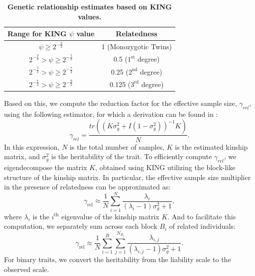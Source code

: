 \begin{table}[h!]
\centering
\begin{tabular}{|c|c|}
\hline
\textbf{Range for KING $\psi$ value} & \textbf{Relatedness} \\
\hline
$\psi \geq 2^{-\frac{3}{2}}$ & 1 (Monozygotic Twins) \\
$2^{-\frac{3}{2}} > \psi \geq 2^{-\frac{5}{2}}$ & 0.5 ($1^{\text{st}}$ degree) \\
$2^{-\frac{5}{2}} > \psi \geq 2^{-\frac{7}{2}}$ & 0.25 ($2^{\text{nd}}$ degree) \\
$2^{-\frac{7}{2}} > \psi \geq 2^{-\frac{9}{2}}$ & 0.125 ($3^{\text{rd}}$ degree) \\
\hline
\end{tabular}
\caption{\textbf{Genetic relationship estimates based on KING values.}}
\label{tab:my_label}
\end{table}

Based on this, we compute the reduction factor for the effective sample size, $\gamma_{rel}$, using the following estimator, for which a derivation can be found in \cite{ziyatdinov2021estimating}:
\begin{equation}
\gamma_{rel} = \frac{tr((K \sigma_g^2 + I (1-\sigma_g^2))^{-1}K)}{N}.
\label{eq:calib_rel}
\end{equation}
In this expression, $N$ is the total number of samples, $K$ is the estimated kinship matrix, and $\sigma_g^2$ is the heritability of the trait.
%
To efficiently compute $\gamma_{rel}$, we eigendecompose the matrix $K$, obtained using KING utilizing the block-like structure of the kinship matrix. 
%
In particular, the effective sample size multiplier in the presence of relatedness can be approximated as:
\begin{equation}
\gamma_{\text{rel}} \approx \frac{1}{N}\sum\limits_{i=1}^{N} \frac{\lambda_i}{(\lambda_i - 1)\sigma_g^2 + 1},
\end{equation}
where $\lambda_i$ is the $i^{\text{th}}$ eigenvalue of the kinship matrix $K$.
%
And to facilitate this computation, we separately sum across each block $B_i$ of related individuals:
\begin{equation}
\gamma_{\text{rel}} \approx \frac{1}{N} \sum\limits_{i=1}^{B} \sum\limits_{j=1}^{N_{B_i}} \frac{\lambda_{i,j}}{(\lambda_{i,j} - 1)\sigma_g^2 + 1}.
\end{equation}
%
For binary traits, we convert the heritability from the liability scale to the observed scale.
%

\vspace{2mm}

